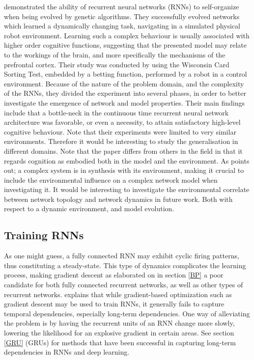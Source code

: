 \cite{Maniadakis2012} demonstrated the ability of recurrent neural networks (RNNs) to self-organize when being evolved by genetic algorithms. They successfully evolved networks which learned a dynamically changing task, navigating in a simulated physical robot environment. Learning such a complex behaviour is usually associated with higher order cognitive functions, suggesting that the presented model may relate to the workings of the brain, and more specifically the mechanisms of the prefrontal cortex.
Their study was conducted by using the Wisconsin Card Sorting Test, embedded by a betting function, performed by a robot in a control environment. Because of the nature of the problem domain, and the complexity of the RNNs, they divided the experiment into several phases, in order to better investigate the emergence of network and model properties. Their main findings include that a bottle-neck in the continuous time recurrent neural network architecture was favorable, or even a necessity, to attain satisfactory high-level cognitive behaviour. Note that their experiments were limited to very similar environments. Therefore it would be interesting to study the generalisation in different domains. Note that the paper differs from others in the field in that it regards cognition as embodied both in the model and the environment. As \cite{Bar-yam1997} points out; a complex system is in synthesis with its environment, making it crucial to include the environmental influence on a complex network model when investigating it. It would be interesting to investigate the environmental correlate between network topology and network dynamics in future work. Both with respect to a dynamic environment, and model evolution.

\subsection{Training RNNs}

As one might guess, a fully connected RNN may exhibit cyclic firing patterns, thus constituting a steady-state. This type of dynamics complicates the learning process, making gradient descent as elaborated on in section \ref{BP} a poor candidate for both fully connected recurrent networks, as well as other types of recurrent networks. \cite{Bengio2013b} explains that while gradient-based optimization such as gradient descent may be used to train RNNs, it generally fails to capture temporal dependencies, especially long-term dependencies. One way of alleviating the problem is by having the recurrent units of an RNN change more slowly, lowering the likelihood for an explosive gradient in certain areas. See section \ref{GRU} (GRUs) for methods that have been successful in capturing long-term dependencies in RNNs and deep learning.

